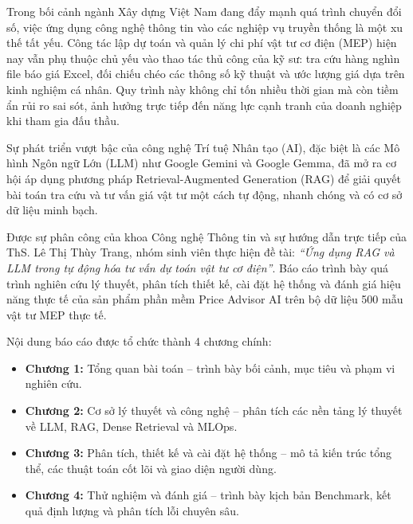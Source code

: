
Trong bối cảnh ngành Xây dựng Việt Nam đang đẩy mạnh quá trình chuyển đổi số, việc ứng dụng công nghệ thông tin vào các nghiệp vụ truyền thống là một xu thế tất yếu. Công tác lập dự toán và quản lý chi phí vật tư cơ điện (MEP) hiện nay vẫn phụ thuộc chủ yếu vào thao tác thủ công của kỹ sư: tra cứu hàng nghìn file báo giá Excel, đối chiếu chéo các thông số kỹ thuật và ước lượng giá dựa trên kinh nghiệm cá nhân. Quy trình này không chỉ tốn nhiều thời gian mà còn tiềm ẩn rủi ro sai sót, ảnh hưởng trực tiếp đến năng lực cạnh tranh của doanh nghiệp khi tham gia đấu thầu.

Sự phát triển vượt bậc của công nghệ Trí tuệ Nhân tạo (AI), đặc biệt là các Mô hình Ngôn ngữ Lớn (LLM) như Google Gemini và Google Gemma, đã mở ra cơ hội áp dụng phương pháp Retrieval-Augmented Generation (RAG) để giải quyết bài toán tra cứu và tư vấn giá vật tư một cách tự động, nhanh chóng và có cơ sở dữ liệu minh bạch.

Được sự phân công của khoa Công nghệ Thông tin và sự hướng dẫn trực tiếp của ThS. Lê Thị Thùy Trang, nhóm sinh viên thực hiện đề tài: \textit{``Ứng dụng RAG và LLM trong tự động hóa tư vấn dự toán vật tư cơ điện''}. Báo cáo trình bày quá trình nghiên cứu lý thuyết, phân tích thiết kế, cài đặt hệ thống và đánh giá hiệu năng thực tế của sản phẩm phần mềm Price Advisor AI trên bộ dữ liệu 500 mẫu vật tư MEP thực tế.

Nội dung báo cáo được tổ chức thành 4 chương chính:
\begin{itemize}
    \item \textbf{Chương 1:} Tổng quan bài toán -- trình bày bối cảnh, mục tiêu và phạm vi nghiên cứu.
    \item \textbf{Chương 2:} Cơ sở lý thuyết và công nghệ -- phân tích các nền tảng lý thuyết về LLM, RAG, Dense Retrieval và MLOps.
    \item \textbf{Chương 3:} Phân tích, thiết kế và cài đặt hệ thống -- mô tả kiến trúc tổng thể, các thuật toán cốt lõi và giao diện người dùng.
    \item \textbf{Chương 4:} Thử nghiệm và đánh giá -- trình bày kịch bản Benchmark, kết quả định lượng và phân tích lỗi chuyên sâu.
\end{itemize}
